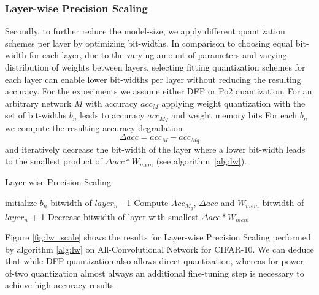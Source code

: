 \subsubsection{Layer-wise Precision Scaling}
\label{layerwise}
Secondly, to further reduce the model-size, we apply different quantization schemes per layer by optimizing bit-widths. In comparison to choosing equal bit-width for each layer, due to the varying amount of parameters and varying distribution of weights between layers, selecting fitting quantization schemes for each layer can enable lower bit-widths per layer without reducing the resulting accuracy.  For the experiments we assume either DFP or Po2 quantization. For an arbitrary network $M$ with accuracy $acc_{M}$ applying weight quantization with the set of bit-widths $b_n$ leads to accuracy $acc_{Mq}$
and weight memory bits
For each $b_n$ we compute the resulting accuracy degradation
\begin{equation}\label{eq:acc_deg}
\Delta acc = acc_{M} - acc_{Mq}
\end{equation}
and iteratively decrease the bit-width of the layer where a lower bit-width leads to the smallest product of $\Delta acc * W_{mem}$  (see algorithm~\ref{alg:lw}).

\begin{algorithm}
\caption{Layer-wise Precision Scaling}\label{alg:lw}
\begin{algorithmic}
\State 
{}
	\State initialize $b_n$
			\State bitwidth of $layer_n$ - 1
			\State Compute $Acc_{M_q}$, $\Delta acc$ and $W_{mem}$
			\State bitwidth of $layer_n$ + 1
		\EndFor	
		\State Decrease bitwidth of layer with smallest $\Delta acc * W_{mem}$
	\EndWhile
\EndProcedure
\end{algorithmic}
\end{algorithm}
Figure \ref{fig:lw_scale} shows the results for Layer-wise Precision Scaling performed by algorithm \ref{alg:lw} on All-Convolutional Network \cite{Springenberg2015} for CIFAR-10. We can deduce that while DFP quantization also allows direct quantization, whereas for power-of-two quantization almost always an additional fine-tuning step is necessary to achieve high accuracy results.

